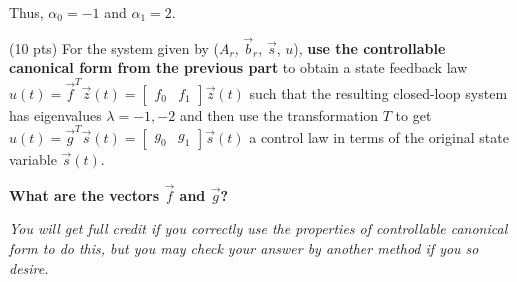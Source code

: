 \begin{enumerate}
{Thus, $\alpha_0 = -1$ and $\alpha_1 = 2$.
}
\startnewpage

\qitem (10 pts) 
For the system given by ($A_r$, $\vec{b}_r$, $\vec{s}$, $u$), {\bf use the
controllable canonical form from the
previous part} to obtain a state feedback law $u(t) = \vec{f}^T
\vec{z}(t) = \begin{bmatrix} 
f_0 & f_1
\end{bmatrix} \vec{z}(t)$ such that the resulting closed-loop system
has eigenvalues $\lambda = -1, -2$ and then use the transformation $T$
to get $u(t) = \vec{g}^T \vec{s}(t) =  \begin{bmatrix} 
g_0 & g_1
\end{bmatrix} \vec{s}(t)$ a control law in terms of the original state
variable $\vec{s}(t)$. 

{\bf What are the vectors $\vec{f}$ and $\vec{g}$?}

{\em You will get full credit if you correctly use the properties of
  controllable canonical form to do this, but you may check your
  answer by another method if you so desire.}

\end{enumerate}
